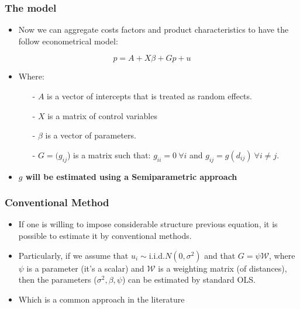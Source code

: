 \documentclass{beamer}
\begin{document}
\begin{frame}
  \frametitle{The model}
  \begin{itemize}
    \item Now we can aggregate costs factors and product characteristics to have the follow econometrical model:
  \end{itemize}

  \[ p  = A + X\beta + Gp + u \]

  \begin{itemize}
    \item Where:
      \begin{itemize}
        \item[-] $A$ is a vector of intercepts that is treated as random effects.
        \item[-] $X$ is a matrix of control variables
        \item[-] $\beta$ is a vector of parameters.
        \item[-] $G = (g_{ij}$) is a matrix such that: $g_{ii} = 0\ \forall i$ and $g_{ij} = g(d_{ij})\ \forall i \ne j$.
      \end{itemize}
    \item \textbf{$g$ will be estimated using a Semiparametric approach}
  \end{itemize}
\end{frame}

\begin{frame}
  \frametitle{Conventional Method}
  \begin{itemize}
    \item If one is willing to impose considerable structure previous equation, it is possible to estimate it by conventional methods.
    \item Particularly, if we assume that $u_i \sim $i.i.d.$N(0, \sigma^2)$ and that $G = \psi\mathcal{W}$, where $\psi$ is a parameter (it's a scalar) and $\mathcal{W}$ is a weighting matrix (of distances), then the parameters ($\sigma^2, \beta, \psi$) can be estimated by standard OLS.


  \item Which is a common approach in the literature
  \end{itemize}
  
\end{frame}
\end{document}
